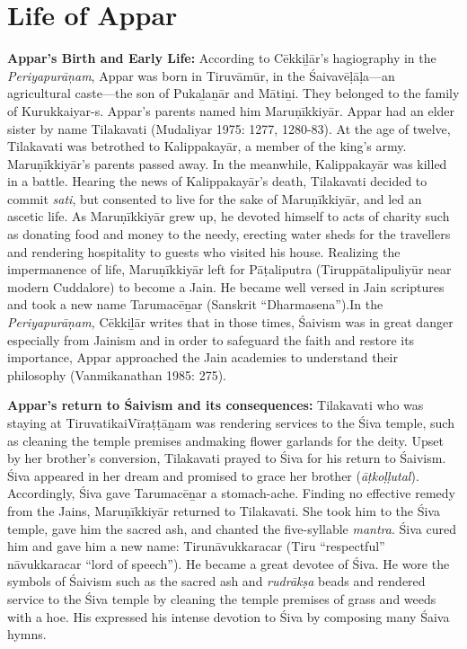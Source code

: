 \section*{Life of Appar}

\textbf{Appar’s Birth and Early Life:} According to Cēkkiḻār’s hagiography in the \textit{Periyapurāņam}, Appar was born in Tiruvāmūr, in the Śaivavēḷāḷa—an agricultural caste—the son of Pukaḻaṉār and Mātiṉi. They belonged to the family of Kurukkaiyar-s. Appar’s parents named him Maruṇīkkiyār. Appar had an elder sister by name Tilakavati (Mudaliyar 1975: 1277, 1280-83). At the age of twelve, Tilakavati was betrothed to Kalippakayār, a member of the king’s army. Maruṇīkkiyār’s parents passed away. In the meanwhile, Kalippakayār was killed in a battle. Hearing the news of Kalippakayār’s death, Tilakavati decided to commit \textit{sati}, but consented to live for the sake of Maruṇīkkiyār, and led an ascetic life. As Maruṇīkkiyār grew up, he devoted himself to acts of charity such as donating food and money to the needy, erecting water sheds for the travellers and rendering hospitality to guests who visited his house. Realizing the impermanence of life, Maruṇīkkiyār left for Pāṭaliputra (Tiruppātalipuliyūr near modern Cuddalore) to become a Jain. He became well versed in Jain scriptures and took a new name Tarumacēṉar (Sanskrit “Dharmasena”).In the \textit{Periyapurāņam, }Cēkkiḻār writes that in those times, Śaivism was in great danger especially from Jainism and in order to safeguard the faith and restore its importance, Appar approached the Jain academies to understand their philosophy (Vanmikanathan 1985: 275). 

\textbf{Appar’s return to Śaivism and its consequences:} Tilakavati who was staying at TiruvatikaiVīraṭṭāṉam was rendering services to the Śiva temple, such as cleaning the temple premises andmaking flower garlands for the deity. Upset by her brother’s conversion, Tilakavati prayed to Śiva for his return to Śaivism. Śiva appeared in her dream and promised to grace her brother (\textit{āṭkoḷḷutal}). Accordingly, Śiva gave Tarumacēṉar a stomach-ache. Finding no effective remedy from the Jains, Maruṇīkkiyār returned to Tilakavati. She took him to the Śiva temple, gave him the sacred ash, and chanted the five-syllable \textit{mantra}. Śiva cured him and gave him a new name: Tirunāvukkaracar (Tiru “respectful” nāvukkaracar “lord of speech”). He became a great devotee of Śiva. He wore the symbols of Śaivism such as the sacred ash and \textit{rudrākṣa} beads and rendered service to the Śiva temple by cleaning the temple premises of grass and weeds with a hoe. His expressed his intense devotion to Śiva by composing many Śaiva hymns.

